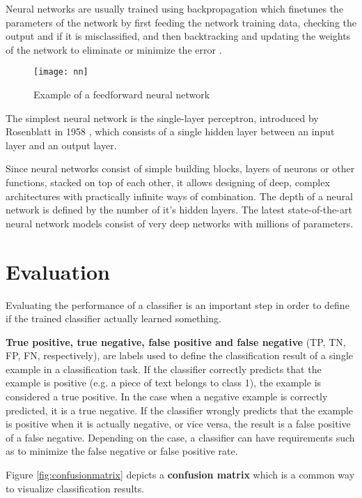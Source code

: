 Neural networks are usually trained using backpropagation which finetunes the parameters of the network by first feeding the network training data, checking the output and if it is misclassified, and then backtracking and updating the weights of the network to eliminate or minimize the error \cite{sebastiani2002}.

\begin{figure}[t]
\texttt{[image: nn]}
\centering
\caption{Example of a feedforward neural network}
\label{fig:nn}
\end{figure}

The simplest neural network is the single-layer perceptron, introduced by Rosenblatt in 1958 \cite{rosenblatt1958}, which consists of a single hidden layer between an input layer and an output layer.

Since neural networks consist of simple building blocks, layers of neurons or other functions, stacked on top of each other, it allows designing of deep, complex architectures with practically infinite ways of combination.
The depth of a neural network is defined by the number of it's hidden layers.
The latest state-of-the-art neural network models consist of very deep networks with millions of parameters.

\section{Evaluation} \label{Evaluation}
Evaluating the performance of a classifier is an important step in order to define if the trained classifier actually learned something.

\textbf{True positive, true negative, false positive and false negative} (TP, TN, FP, FN, respectively), are labels used to define the classification result of a single example in a classification task.
If the classifier correctly predicts that the example is positive (e.g. a piece of text belongs to class 1), the example is considered a true positive.
In the case when a negative example is correctly predicted, it is a true negative.
If the classifier wrongly predicts that the example is positive when it is actually negative, or vice versa, the result is a false positive of a false negative.
Depending on the case, a classifier can have requirements such as to minimize the false negative or false positive rate.

Figure \ref{fig:confusionmatrix} depicts a \textbf{confusion matrix} which is a common way to visualize classification results.

